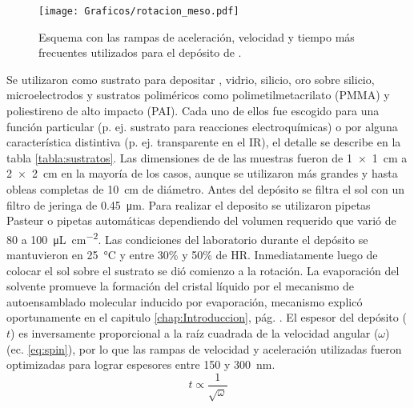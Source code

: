 						  \begin{figure}[!ht]
						  \begin{center}
						  \texttt{[image: Graficos/rotacion\_meso.pdf]}
						  \caption[Parámetros de depósito para las \pdm]{Esquema con las rampas de aceleración, velocidad y tiempo más frecuentes utilizados para el depósito de \pdm.}
						  \label{fig:rampa-spin}
						  \end{center}
						  \end{figure}
			Se utilizaron como sustrato para depositar \pdm , vidrio, silicio, oro sobre silicio, microelectrodos y sustratos poliméricos como  polimetilmetacrilato (PMMA) y poliestireno de alto impacto (PAI). Cada uno de ellos fue escogido para una función particular (p. ej. sustrato para reacciones electroquímicas) o por alguna característica distintiva (p. ej. transparente en el IR), el detalle se describe en la tabla \ref{tabla:sustratos}.
			Las dimensiones de de las muestras fueron de \SI{1x1}{\cm} a \SI{2x2}{\cm} en la mayoría de los casos, aunque se utilizaron más grandes y hasta obleas completas de \SI{10}{\cm} de diámetro. Antes del depósito se filtra el sol con un filtro de jeringa de \SI{0.45}{\um}. Para realizar el deposito se utilizaron pipetas Pasteur o pipetas automáticas dependiendo del volumen requerido que varió de 80 a \SI{100}{\uL.\cm^{-2}}. Las condiciones del laboratorio durante el depósito se mantuvieron en \SI{25}{\celsius} y entre 30\% y 50\% de HR.					  
			Inmediatamente luego de colocar el sol sobre el sustrato se dió comienzo a la rotación. La evaporación del solvente promueve la formación del cristal líquido por el mecanismo de autoensamblado molecular inducido por evaporación, mecanismo explicó oportunamente en el capitulo \ref{chap:Introduccion}, pág. \pageref{sec:mesoporosos}. El espesor del depósito ($t$) es inversamente proporcional a la raíz cuadrada de la velocidad angular ($\omega$)\cite{Meyerhofer1978,Hall1998} (ec. \ref{eq:spin}), por lo que las rampas de velocidad y aceleración utilizadas fueron optimizadas para lograr espesores entre 150 y \SI{300}{\nm}\cite{Nano-compuestas2013}. 
					\begin{equation}
			 		    t\propto \frac{1}{\sqrt{\omega}}
			 		     \label{eq:spin}
						\end{equation}
